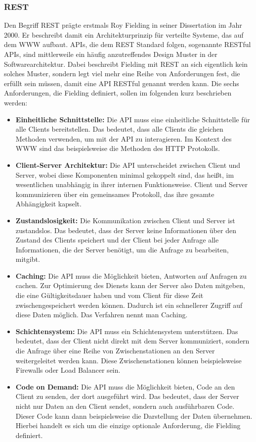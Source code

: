 \subsubsection*{REST}
Den Begriff \ac{REST} prägte erstmals Roy Fielding in seiner Dissertation im Jahr 2000. Er beschreibt damit ein Architekturprinzip für verteilte Systeme, das auf dem \ac{WWW} aufbaut. \cite[Vgl. ][S. 76]{REST2000} \ac{API}s, die dem REST Standard folgen, sogenannte \ac{REST}ful \ac{API}s, sind mittlerweile ein häufig anzutreffendes Design Muster in der Softwarearchitektur. Dabei beschreibt Fielding mit \ac{REST} an sich eigentlich kein solches Muster, sondern legt viel mehr eine Reihe von Anforderungen fest, die erfüllt sein müssen, damit eine \ac{API} \ac{REST}ful genannt werden kann. \cite[Vgl. ][S. XV]{richardson2007web} Die sechs Anforderungen, die Fielding definiert, sollen im folgenden kurz beschrieben werden:
\begin{itemize}
  \item 
  \textbf{Einheitliche Schnittstelle:} Die \ac{API} muss eine einheitliche Schnittstelle für alle Clients bereitstellen. Das bedeutet, dass alle Clients die gleichen Methoden verwenden, um mit der \ac{API} zu interagieren. Im Kontext des \ac{WWW} sind das beispielsweise die Methoden des \ac{HTTP} Protokolls.
  \item \textbf{Client-Server Architektur:} Die \ac{API} unterscheidet zwischen Client und Server, wobei diese Komponenten minimal gekoppelt sind, das heißt, im wesentlichen unabhängig in ihrer internen Funktionsweise. Client und Server kommunizieren über ein gemeinsames Protokoll, das ihre gesamte Abhängigkeit kapselt.
  \item \textbf{Zustandslosigkeit:} Die Kommunikation zwischen Client und Server ist zustandslos. Das bedeutet, dass der Server keine Informationen über den Zustand des Clients speichert und der Client bei jeder Anfrage alle Informationen, die der Server benötigt, um die Anfrage zu bearbeiten, mitgibt. 
  \item \textbf{Caching:} Die \ac{API} muss die Möglichkeit bieten, Antworten auf Anfragen zu cachen. Zur Optimierung des Diensts kann der Server also Daten mitgeben, die eine Gültigkeitsdauer haben und vom Client für diese Zeit zwischengespeichert werden können. Dadurch ist ein schnellerer Zugriff auf diese Daten möglich. Das Verfahren nennt man Caching.
  \item \textbf{Schichtensystem:} Die \ac{API} muss ein Schichtensystem unterstützen. Das bedeutet, dass der Client nicht direkt mit dem Server kommuniziert, sondern die Anfrage über eine Reihe von Zwischenstationen an den Server weitergeleitet werden kann. Diese Zwischenstationen können beispielsweise Firewalls oder Load Balancer sein.
  \item \textbf{Code on Demand:} Die \ac{API} muss die Möglichkeit bieten, Code an den Client zu senden, der dort ausgeführt wird. Das bedeutet, dass der Server nicht nur Daten an den Client sendet, sondern auch ausführbaren Code. Dieser Code kann dann beispielsweise die Darstellung der Daten übernehmen. Hierbei handelt es sich um die einzige optionale Anforderung, die Fielding definiert.
  \cite[Vgl. ][]{redhat_2020_was}
\end{itemize}

